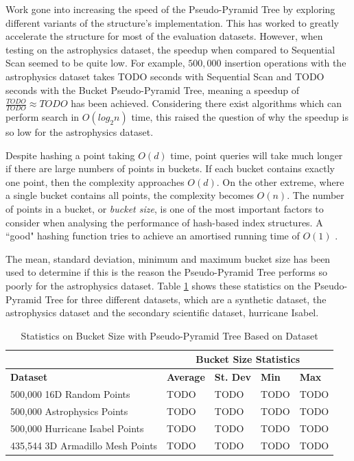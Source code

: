 Work gone into increasing the speed of the Pseudo-Pyramid Tree by exploring different variants of the structure's implementation. This has worked to greatly accelerate the structure for most of the evaluation datasets. However, when testing on the astrophysics dataset, the speedup when compared to Sequential Scan seemed to be quite low. For example, $500,000$ insertion operations with the astrophysics dataset takes TODO seconds with Sequential Scan and TODO seconds with the Bucket Pseudo-Pyramid Tree, meaning a speedup of $\frac{TODO}{TODO} \approx TODO$ has been achieved. Considering there exist algorithms which can perform search in $O(log_2 n)$ time, this raised the question of why the speedup is so low for the astrophysics dataset.

Despite hashing a point taking $O(d)$ time, point queries will take much longer if there are large numbers of points in buckets. If each bucket contains exactly one point, then the complexity approaches $O(d)$. On the other extreme, where a single bucket contains all points, the complexity becomes $O(n)$. The number of points in a bucket, or \textit{bucket size}, is one of the most important factors to consider when analysing the performance of hash-based index structures. A ``good" hashing function tries to achieve an amortised running time of $O(1)$ \cite{TODO}.

The mean, standard deviation, minimum and maximum bucket size has been used to determine if this is the reason the Pseudo-Pyramid Tree performs so poorly for the astrophysics dataset. Table \ref{tab:perf1-bucket-stats} shows these statistics on the Pseudo-Pyramid Tree for three different datasets, which are a synthetic dataset, the astrophysics dataset and the secondary scientific dataset, hurricane Isabel.

\begin{table}
	\centering
	\begin{tabular}{|l|l|l|l|l|}
		\hline
		\textbf{} & \multicolumn{4}{c|}{\textbf{Bucket Size Statistics}} \\
		\hline
		\textbf{Dataset} & \textbf{Average} & \textbf{St. Dev} & \textbf{Min} & \textbf{Max} \\
		\hline
		500,000 16D Random Points & TODO & TODO & TODO & TODO \\
		500,000 Astrophysics Points & TODO & TODO & TODO & TODO \\
		500,000 Hurricane Isabel Points & TODO & TODO & TODO & TODO \\
		435,544 3D Armadillo Mesh Points & TODO & TODO & TODO & TODO \\
		\hline
	\end{tabular}
	\caption{Statistics on Bucket Size with Pseudo-Pyramid Tree Based on Dataset}
	\label{tab:perf1-bucket-stats}
\end{table}

